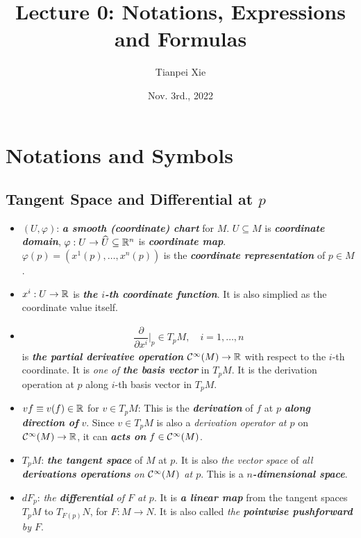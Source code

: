 \documentclass[11pt]{article}
\begin{document}
\title{Lecture 0: Notations, Expressions and Formulas}
\author{ Tianpei Xie}
\date{Nov. 3rd., 2022}
\maketitle
\tableofcontents
\newpage
\section{Notations and Symbols}
\subsection{Tangent Space and Differential at $p$}
\begin{itemize}
\item $(U, \varphi)$: \emph{\textbf{a smooth (coordinate) chart}} for $M$. $U \subseteq M$ is \emph{\textbf{coordinate domain}}, $\varphi: U \rightarrow \widehat{U} \subseteq {\mathbb R}^{n}$ is \emph{\textbf{coordinate map}}. $\varphi(p) = (x^1(p), \ldots, x^{n}(p))$ is the \emph{\textbf{coordinate representation}} of $p \in M$.

\item $x^{i}: U \rightarrow {\mathbb R}$ is \emph{\textbf{the $i$-th coordinate function}}. It is also simplied as the coordinate value itself.

\item \begin{align*}
\dfrac{\partial}{\partial x^{i}}\Bigr|_{p} \in T_pM, \quad i=1,\ldots, n
\end{align*}  is \emph{\textbf{the partial derivative operation}} ${\mathcal C}^{\infty}(M) \rightarrow {\mathbb R}$ with respect to the $i$-th coordinate. It is \emph{one of \textbf{the basis vector}} in $T_pM$. It is the derivation operation at $p$ along $i$-th basis vector in $T_pM$.

\item $vf \equiv v(f) \in {\mathbb R}$ for $v \in T_pM$: \quad This is the \emph{\textbf{derivation}} of $f$ at $p$ \emph{\textbf{along direction of}} $v$. Since $v\in T_pM$ is also a \emph{derivation operator at $p$} on ${\mathcal C}^{\infty}(M) \rightarrow {\mathbb R}$, it can \emph{\textbf{acts on}} $f\in {\mathcal C}^{\infty}(M)$.

\item $T_pM$: \quad  \emph{\textbf{the tangent space}} of $M$ at $p$. It is also \emph{the vector space} of \emph{all \textbf{derivations operations} on ${\mathcal C}^{\infty}(M)$ at $p$}. This is a \emph{\textbf{$n$-dimensional space}}.

\item  $dF_p$: \quad \emph{the \textbf{differential} of $F$ at $p$}. It is \emph{\textbf{a linear map}} from the tangent spaces $T_{p}M$ to $T_{F(p)}N$, for $F: M \rightarrow N$. It is also called \emph{the \textbf{pointwise pushforward} by $F$}.


\end{itemize}
\end{document}
